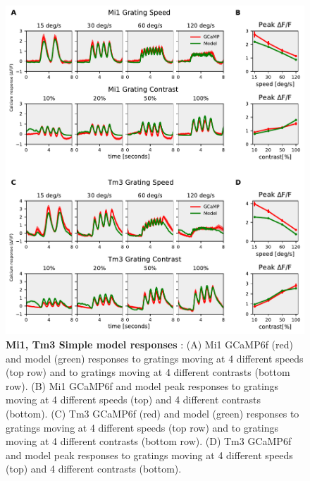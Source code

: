 \documentclass[9pt,lineno]{elife}
\begin{document}
%
%	

\begin{figure}
\begin{fullwidth}
\includegraphics[width=0.84\linewidth]{figure8}
\caption{\textbf{Mi1, Tm3 Simple model responses} : (A) Mi1 GCaMP6f (red) and model (green) responses to gratings moving at 4 different speeds (top row) and to gratings moving at 4 different contrasts (bottom row). (B) Mi1 GCaMP6f and model peak responses to gratings moving at 4 different speeds (top) and 4 different contrasts (bottom). (C) Tm3 GCaMP6f (red) and model (green) responses to gratings moving at 4 different speeds (top row) and to gratings moving at 4 different contrasts (bottom row). (D) Tm3 GCaMP6f and model peak responses to gratings moving at 4 different speeds (top) and 4 different contrasts (bottom).}

\label{Mi1Tm3model}
	
\end{fullwidth}
\end{figure} 
\end{document}
